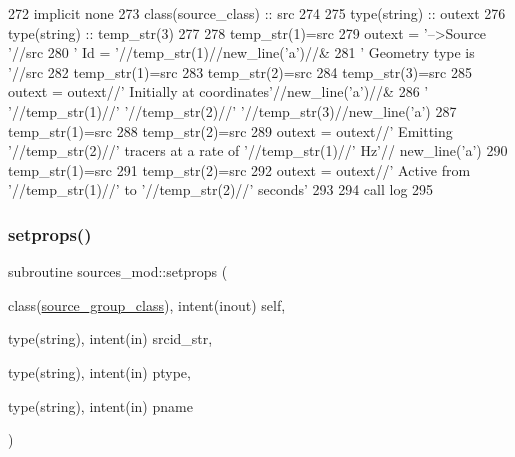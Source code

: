 \begin{DoxyCode}
272     \textcolor{keywordtype}{implicit none}
273     \textcolor{keywordtype}{class}(source\_class) :: src
274 
275     \textcolor{keywordtype}{type}(string) :: outext
276     \textcolor{keywordtype}{type}(string) :: temp\_str(3)
277 
278     temp\_str(1)=src%
279     outext = \textcolor{stringliteral}{'-->Source '}//src%
280         \textcolor{stringliteral}{'       Id = '}//temp\_str(1)//new\_line(\textcolor{stringliteral}{'a'})//&
281         \textcolor{stringliteral}{'       Geometry type is '}//src%
282     temp\_str(1)=src%
283     temp\_str(2)=src%
284     temp\_str(3)=src%
285     outext = outext//\textcolor{stringliteral}{'       Initially at coordinates'}//new\_line(\textcolor{stringliteral}{'a'})//&
286         \textcolor{stringliteral}{'       '}//temp\_str(1)//\textcolor{stringliteral}{' '}//temp\_str(2)//\textcolor{stringliteral}{' '}//temp\_str(3)//new\_line(\textcolor{stringliteral}{'a'})
287     temp\_str(1)=src%
288     temp\_str(2)=src%
289     outext = outext//\textcolor{stringliteral}{'       Emitting '}//temp\_str(2)//\textcolor{stringliteral}{' tracers at a rate of '}//temp\_str(1)//\textcolor{stringliteral}{' Hz'}//
      new\_line(\textcolor{stringliteral}{'a'})
290     temp\_str(1)=src%
291     temp\_str(2)=src%
292     outext = outext//\textcolor{stringliteral}{'       Active from '}//temp\_str(1)//\textcolor{stringliteral}{' to '}//temp\_str(2)//\textcolor{stringliteral}{' seconds'}
293 
294     \textcolor{keyword}{call }log%
295 
\end{DoxyCode}
\mbox{\label{namespacesources__mod_aa02996b7219ce9c9d26439e8d2d0a468}} 
\subsubsection{\texorpdfstring{setprops()}{setprops()}}
{\footnotesize\ttfamily subroutine sources\+\_\+mod\+::setprops (\begin{DoxyParamCaption}\item[{class(\mbox{\hyperlink{structsources__mod_1_1source__group__class}{source\+\_\+group\+\_\+class}}), intent(inout)}]{self,  }\item[{type(string), intent(in)}]{srcid\+\_\+str,  }\item[{type(string), intent(in)}]{ptype,  }\item[{type(string), intent(in)}]{pname }\end{DoxyParamCaption})\hspace{0.3cm}{\ttfamily [private]}}



